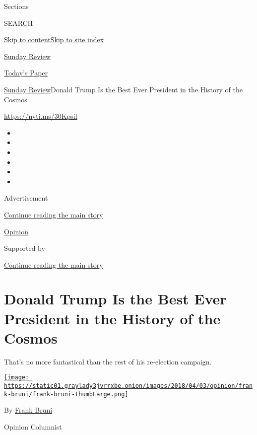 Sections

SEARCH

\protect\hyperlink{site-content}{Skip to
content}\protect\hyperlink{site-index}{Skip to site index}

\href{https://www.nytimes3xbfgragh.onion/section/opinion/sunday}{Sunday
Review}

\href{https://myaccount.nytimes3xbfgragh.onion/auth/login?response_type=cookie\&client_id=vi}{}

\href{https://www.nytimes3xbfgragh.onion/section/todayspaper}{Today's
Paper}

\href{/section/opinion/sunday}{Sunday Review}\textbar{}Donald Trump Is
the Best Ever President in the History of the Cosmos

\url{https://nyti.ms/30Kpsil}

\begin{itemize}
\item
\item
\item
\item
\item
\item
\end{itemize}

Advertisement

\protect\hyperlink{after-top}{Continue reading the main story}

\href{/section/opinion}{Opinion}

Supported by

\protect\hyperlink{after-sponsor}{Continue reading the main story}

\hypertarget{donald-trump-is-the-best-ever-president-in-the-history-of-the-cosmos}{%
\section{Donald Trump Is the Best Ever President in the History of the
Cosmos}\label{donald-trump-is-the-best-ever-president-in-the-history-of-the-cosmos}}

That's no more fantastical than the rest of his re-election campaign.

\href{https://www.nytimes3xbfgragh.onion/by/frank-bruni}{\texttt{[image: https://static01.graylady3jvrrxbe.onion/images/2018/04/03/opinion/frank-bruni/frank-bruni-thumbLarge.png]}}

By \href{https://www.nytimes3xbfgragh.onion/by/frank-bruni}{Frank Bruni}

Opinion Columnist

